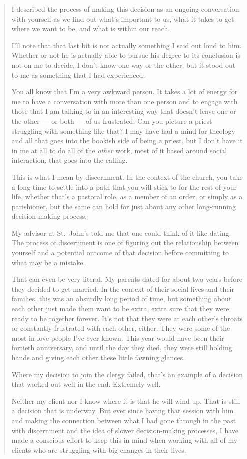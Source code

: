 \begin{quote}
I described the process of making this decision as an ongoing conversation with yourself as we find out what's important to us, what it takes to get where we want to be, and what is within our reach.

I'll note that that last bit is not actually something I said out loud to him. Whether or not he is actually able to pursue his degree to its conclusion is not on me to decide, I don't know one way or the other, but it stood out to me as something that I had experienced.

You all know that I'm a very awkward person. It takes a lot of energy for me to have a conversation with more than one person and to engage with those that I am talking to in an interesting way that doesn't leave one or the other --- or both --- of us frustrated. Can you picture a priest struggling with something like that? I may have had a mind for theology and all that goes into the bookish side of being a priest, but I don't have it in me at all to do all of the \emph{other} work, most of it based around social interaction, that goes into the calling.

This is what I mean by discernment. In the context of the church, you take a long time to settle into a path that you will stick to for the rest of your life, whether that's a pastoral role, as a member of an order, or simply as a parishioner, but the same can hold for just about any other long-running decision-making process.

My advisor at St.~John's told me that one could think of it like dating. The process of discernment is one of figuring out the relationship between yourself and a potential outcome of that decision before committing to what may be a mistake.

That can even be very literal. My parents dated for about two years before they decided to get married. In the context of their social lives and their families, this was an absurdly long period of time, but something about each other just made them want to be extra, extra sure that they were ready to be together forever. It's not that they were at each other's throats or constantly frustrated with each other, either. They were some of the most in-love people I've ever known. This year would have been their fortieth anniversary, and until the day they died, they were still holding hands and giving each other these little fawning glances.

Where my decision to join the clergy failed, that's an example of a decision that worked out well in the end. Extremely well.

Neither my client nor I know where it is that he will wind up. That is still a decision that is underway. But ever since having that session with him and making the connection between what I had gone through in the past with discernment and the idea of slower decision-making processes, I have made a conscious effort to keep this in mind when working with all of my clients who are struggling with big changes in their lives.
\end{quote}

